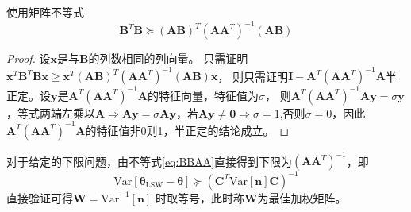 \documentclass{article}
\def\Var{\textrm{Var}}
\begin{document}
\begin{enumerate}
使用矩阵不等式
\begin{equation}\label{eq:BBAA}
 \bm{B}^T\bm{B}\succcurlyeq (\bm{A}\bm{B})^T (\bm{A}\bm{A}^T)^{-1} (\bm{A}\bm{B})
\end{equation}
\begin{proof}
设$\bm{x}$是与$\bm{B}$的列数相同的列向量。
只需证明$ \bm{x}^T\bm{B}^T\bm{B}\bm{x}\geq \bm{x}^T(\bm{A}\bm{B})^T (\bm{A}\bm{A}^T)^{-1} (\bm{A}\bm{B})\bm{x}$，
则只需证明$\bm{I}-\bm{A}^T(\bm{A}\bm{A}^T)^{-1}\bm{A}$半正定。设$\bm{y}$是$\bm{A}^T(\bm{A}\bm{A}^T)^{-1}\bm{A}$的特征向量，特征值为$\sigma$，
则$\bm{A}^T(\bm{A}\bm{A}^T)^{-1}\bm{A}\bm{y}=\sigma\bm{y}$，等式两端左乘以$\bm{A}\Rightarrow \bm{A}\bm{y}=\sigma\bm{A}\bm{y}$，若$\bm{A}
\bm{y}\neq \bm{0} \Rightarrow \sigma=1$,否则$\sigma=0$，因此$\bm{A}^T(\bm{A}\bm{A}^T)^{-1}\bm{A}$的特征值非0则1，半正定的结论成立。
\end{proof}
对于给定的下限问题，由不等式\eqref{eq:BBAA}直接得到下限为$(\bm{A}\bm{A}^T)^{-1}$，即
$$
\Var[\bm{\theta}_{\textrm{LSW}}-\bm{\theta}] \succcurlyeq (\bm{C}^T \Var[\bm{n}]\bm{C})^{-1}
$$
直接验证可得$\bm{W}=\Var^{-1}[\bm{n}]$ 时取等号，此时称$\bm{W}$为最佳加权矩阵。

\end{enumerate}
\end{document}
